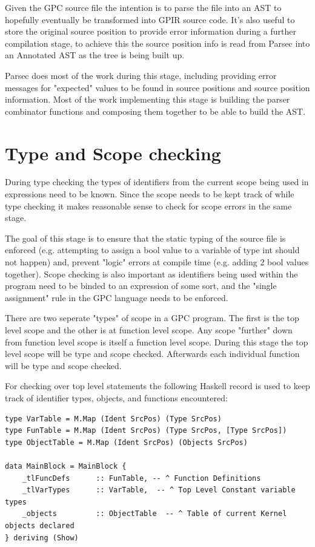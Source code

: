 Given the GPC source file the intention is to parse the file into an AST
to hopefully eventually be transformed into GPIR source code. It's
also useful to store the original source position to provide error information 
during a further compilation stage, to achieve this the source position
info is read from Parsec into an Annotated AST as the tree is being built up.

Parsec does most of the work during this stage, including
providing error messages for "expected" values to be found in source
positions and source position information. Most of the work implementing
this stage is building the parser combinator functions and composing
them together to be able to build the AST.


\section{Type and Scope checking}

During type checking the types of identifiers from the current scope being used in expressions need
to be known. Since the scope needs to be kept track of while type checking it makes reasonable
sense to check for scope errors in the same stage.

The goal of this stage is to ensure that the static typing of the source file
is enforced (e.g. attempting to assign a bool value to a variable of type int should not happen) and,
prevent "logic" errors at compile time (e.g. adding 2 bool values together). Scope checking
is also important as identifiers being used within the program need to be binded to an expression of
some sort, and the "single assignment" rule in the GPC language needs to be enforced.

There are two seperate "types" of scope in a GPC program. The first is the top level scope and the
other is at function level scope. Any scope "further" down from function level scope is itself
a function level scope. During this stage the top level scope will be type and scope checked.
Afterwards each individual function will be type and scope checked.

For checking over top level statements the following Haskell record is used
to keep track of identifier types, objects, and functions encountered:

\begin{lstlisting}[style=myHaskell]
type VarTable = M.Map (Ident SrcPos) (Type SrcPos)
type FunTable = M.Map (Ident SrcPos) (Type SrcPos, [Type SrcPos])
type ObjectTable = M.Map (Ident SrcPos) (Objects SrcPos)

data MainBlock = MainBlock {
    _tlFuncDefs      :: FunTable, -- ^ Function Definitions
    _tlVarTypes      :: VarTable,  -- ^ Top Level Constant variable types
    _objects         :: ObjectTable  -- ^ Table of current Kernel objects declared 
} deriving (Show)
\end{lstlisting}

